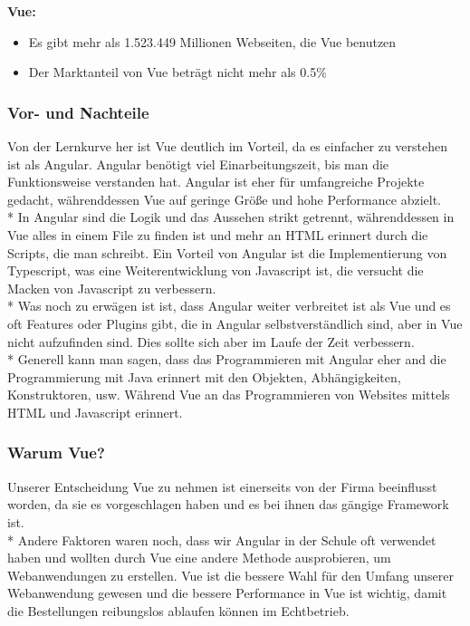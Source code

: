 \textbf{Vue:}
\begin{itemize}
    \item Es gibt mehr als 1.523.449 Millionen Webseiten, die Vue benutzen
    \item Der Marktanteil von Vue beträgt nicht mehr als 0.5\% \cite{AngVsVueSIM}       
\end{itemize}
\subsubsection{Vor- und Nachteile}
Von der Lernkurve her ist Vue deutlich im Vorteil, da es einfacher zu verstehen ist als Angular. Angular benötigt viel Einarbeitungszeit, bis man die Funktionsweise
verstanden hat. Angular ist eher für umfangreiche Projekte gedacht, währenddessen Vue auf geringe Größe und hohe Performance abzielt. \\*
In Angular sind die Logik und das Aussehen strikt getrennt, währenddessen in Vue alles in einem File zu finden ist und mehr an HTML erinnert durch die Scripts, die man schreibt.
Ein Vorteil von Angular ist die Implementierung von Typescript, was eine Weiterentwicklung von Javascript ist, die versucht die Macken von Javascript zu verbessern.\\* 
Was noch zu erwägen ist ist, dass Angular weiter verbreitet ist als Vue und es oft Features oder Plugins gibt, die in Angular selbstverständlich sind, aber in Vue nicht aufzufinden sind.
Dies sollte sich aber im Laufe der Zeit verbessern. \\*  Generell kann man sagen, dass das Programmieren mit Angular eher and die Programmierung mit Java erinnert mit den Objekten, Abhängigkeiten,
Konstruktoren, usw. Während Vue an das Programmieren von Websites mittels HTML und Javascript erinnert. \cite{AngVsVueHOST}
\subsubsection{Warum Vue?}
Unserer Entscheidung Vue zu nehmen ist einerseits von der Firma beeinflusst worden, da sie es vorgeschlagen haben und es bei ihnen das gängige Framework ist.\\*
Andere Faktoren waren noch, dass wir Angular in der Schule oft verwendet haben und wollten durch Vue eine andere Methode ausprobieren, um Webanwendungen zu erstellen.
Vue ist die bessere Wahl für den Umfang unserer Webanwendung gewesen und die bessere Performance in Vue ist wichtig, damit die Bestellungen reibungslos ablaufen können im Echtbetrieb.

